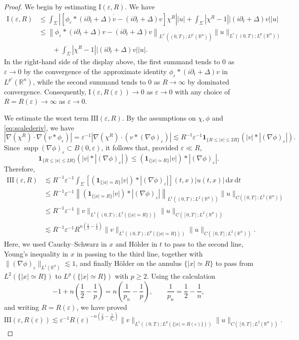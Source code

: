 \documentclass[10pt,a4paper]{amsart}
\newcommand{\R}{\mathbb{R}}
\def\d{\partial}
\newcommand{\dd}{\mathrm{d}}
\def\ind{\mathbf 1}
\def\ovl{\overline}
\DeclareMathOperator{\supp}{supp}
\def\ve{\varepsilon}
\begin{document}
\begin{proof}
We begin by estimating $\mathrm I(\ve,R)$. We have
\[
\begin{split}
\mathrm{I}(\ve,R) &\leq  \int_\Sigma \left| \left[\ovl{\phi_\ve*\left(i\d_t+\Delta\right)v - \left(i\d_t+\Delta\right)v } \right] \chi^R \right| |u|  + \int_\Sigma \left|\chi^R - 1\right| \left|\left(i\d_t +\Delta\right)v \right| |u| 
\\
&\leq \left\| \phi_\ve*\left(i\d_t+\Delta\right)v - \left(i\d_t+\Delta\right)v \right\|_{L^{r'}((0, T); L^{p'}(\R^n))} \| u \|_{L^r((0, T); L^p(\R^n))} 
\\
& \qquad + \int_\Sigma \left|\chi^R - 1\right| \left|\left(i\d_t +\Delta\right)v \right| |u|.
\end{split}
\]
In the right-hand side of the display above, the first summand tends to $0$ as $\varepsilon\to0$ by the convergence of the approximate identity $\phi_\varepsilon*(i\d_t+\Delta)v$ in $L^{p'}(\R^n)$, while the second summand tends to $0$ as $R\to\infty$ by dominated convergence. Consequently, $\mathrm I(\ve,R(\ve))\to 0$ as $\varepsilon\to0$ with any choice of $R=R(\varepsilon)\to\infty$ as $\ve \to 0$.

We estimate the worst term $\mathrm{III}(\varepsilon,R)$. By the assumptions on $\chi,\phi$ and \eqref{eq:scalederiv}, we have
\[
\left|\nabla(\chi^R)\cdot\nabla(v*\phi_\varepsilon)\right|= \ve^{-1} \left|\nabla(\chi^R)\cdot (v*(\nabla\phi)_\varepsilon)\right| \lesssim R^{-1}\varepsilon^{-1} \ind_{\{R\le |x|\le 2R\}}  \left(|v|*|(\nabla\phi)_\varepsilon|\right).
\]
Since $\supp (\nabla\phi)_\varepsilon \subset B(0,\varepsilon)$, it follows that, provided
$\varepsilon\ll R$,
\[
\ind_{\{R\le |x|\le 2R\}}\left(|v|*|(\nabla\phi)_\varepsilon|\right) \leq \left(\ind_{\{|x|\simeq R\}}|v|\right)*|(\nabla\phi)_\varepsilon|.
\]
Therefore,
\[
\begin{split}
\mathrm{III}(\varepsilon,R) &\lesssim R^{-1}\varepsilon^{-1}\int_\Sigma \left[\left(\ind_{\{|x|\simeq R\}}|v|\right)*|(\nabla\phi)_\varepsilon|\right](t,x) |u(t,x)|\,\dd x\,\dd t
\\
&\le R^{-1}\varepsilon^{-1}  \left\|\left(\ind_{\{|x|\simeq R\}}|v|\right)*|(\nabla\phi)_\varepsilon|\right\|_{L^1((0,T);L^2(\R^n))} \|u\|_{C([0,T];L^2(\R^n))}
\\
&\le R^{-1}\varepsilon^{-1} \|v\|_{L^1((0,T);L^2(\{|x|\simeq R\}))}\|u\|_{C([0,T];L^2(\R^n))} 
\\
&\lesssim R^{-1}\varepsilon^{-1}  R^{n(\frac12-\frac1p)} \|v\|_{L^1((0,T);L^p(\{|x|\simeq R\}))}\|u\|_{C([0,T];L^2(\R^n))} .
\end{split}
\]
Here, we used Cauchy--Schwarz in $x$ and H\"older in $t$ to pass to the second line, Young's inequality in $x$ in passing to the third line, together with $\|(\nabla\phi)_\varepsilon\|_{L^1(\R^n)}\lesssim 1$, and finally H\"older on the annulus $\{|x|\simeq R\}$ to pass from $L^2(\{|x|\simeq R\})$ to $L^p(\{|x|\simeq R\})$ with $p\geq2$. Using the calculation
\[
-1+n\left(\frac12-\frac1p\right)= n\left(\frac1{p_n}-\frac1p\right), \qquad  \frac1{p_n}=\frac12-\frac1n,
\]
and writing $R=R(\varepsilon)$, we have proved
\[
\mathrm{III}(\varepsilon,R(\varepsilon)) \lesssim \varepsilon^{-1}R(\varepsilon)^{-n(\frac1p-\frac1{p_n})} \|v\|_{L^1((0,T);L^p(\{|x|\simeq R(\varepsilon)\}))} \|u\|_{C([0,T];L^2(\R^n))}.
\]


\end{proof}
\end{document}
